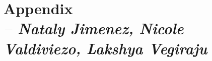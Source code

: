\chapter{Appendix \\
\small{\textit{-- Nataly Jimenez, Nicole Valdiviezo, Lakshya Vegiraju}}
\label{Chapter::Appendix}}